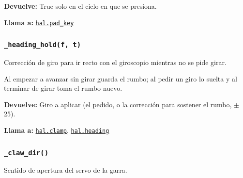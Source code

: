 \par{}\par\smallskip
\noindent\textbf{Devuelve:} True solo en el ciclo en que se presiona.\par
\noindent\textbf{Llama a:} \hyperref[fn:hal:pad-key]{\texttt{hal.pad\_\allowbreak{}key}}\par

\subsubsection{\texttt{\_\allowbreak{}heading\_\allowbreak{}hold(f, t)}}\label{fn:manual:-heading-hold}
\noindent Corrección de giro para ir recto con el giroscopio mientras no se pide girar.

Al empezar a avanzar sin girar guarda el rumbo; al pedir un giro lo suelta y al terminar de girar toma el rumbo nuevo.

\par{}\par\smallskip
\noindent\textbf{Devuelve:} Giro a aplicar (el pedido, o la corrección para sostener el rumbo, \(\pm\)25).\par
\noindent\textbf{Llama a:} \hyperref[fn:hal:clamp]{\texttt{hal.clamp}}, \hyperref[fn:hal:heading]{\texttt{hal.heading}}\par

\subsubsection{\texttt{\_\allowbreak{}claw\_\allowbreak{}dir()}}\label{fn:manual:-claw-dir}
\noindent Sentido de apertura del servo de la garra.

